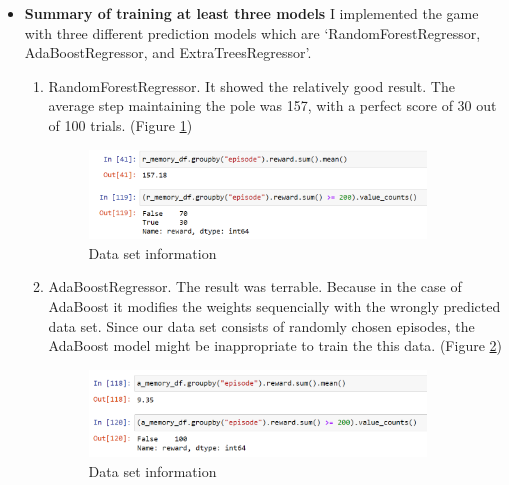 \documentclass[12pt]{article}
\begin{document}
\begin{itemize}

\item \textbf{Summary of training at least three models} I implemented the game with three different prediction models which are  `RandomForestRegressor, AdaBoostRegressor, and ExtraTreesRegressor'.
    \begin{enumerate}
      \item RandomForestRegressor. It showed the relatively good result. The average step maintaining the pole was 157, with a perfect score of 30 out of 100 trials. (Figure \ref{random_forest})
      \begin{figure}[H]
        \centering
        \includegraphics[width=0.9\textwidth]{figures/random_forest.png}
        \caption{Data set information}\label{random_forest}
      \end{figure}

      \item AdaBoostRegressor. The result was terrable. Because in the case of AdaBoost it modifies the weights sequencially with the wrongly predicted data set. Since our data set consists of randomly chosen episodes, the AdaBoost model might be inappropriate to train the this data. (Figure \ref{AdaBoost})
      \begin{figure}[H]
        \centering
        \includegraphics[width=0.9\textwidth]{figures/AdaBoost.png}
        \caption{Data set information}\label{AdaBoost}
      \end{figure}


\end{enumerate}
\end{itemize}
\end{document}

